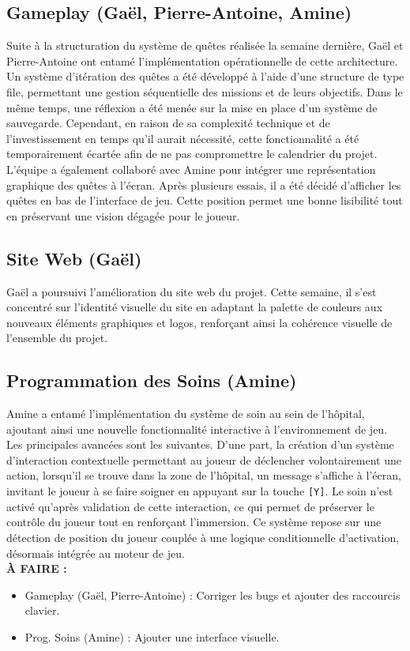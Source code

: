\documentclass{report}
\begin{document}
\subsection*{Gameplay (Gaël, Pierre-Antoine, Amine)}
Suite à la structuration du système de quêtes réalisée la semaine dernière, Gaël et Pierre-Antoine ont entamé l’implémentation opérationnelle de cette architecture. Un système d’itération des quêtes a été développé à l’aide d’une structure de type file, permettant une gestion séquentielle des missions et de leurs objectifs. Dans le même temps, une réflexion a été menée sur la mise en place d’un système de sauvegarde. Cependant, en raison de sa complexité technique et de l'investissement en temps qu’il aurait nécessité, cette fonctionnalité a été temporairement écartée afin de ne pas compromettre le calendrier du projet. L’équipe a également collaboré avec Amine pour intégrer une représentation graphique des quêtes à l’écran. Après plusieurs essais, il a été décidé d’afficher les quêtes en bas de l’interface de jeu. Cette position permet une bonne lisibilité tout en préservant une vision dégagée pour le joueur.


\subsection*{Site Web (Gaël)}
Gaël a poursuivi l’amélioration du site web du projet. Cette semaine, il s’est concentré sur l’identité visuelle du site en adaptant la palette de couleurs aux nouveaux éléments graphiques et logos, renforçant ainsi la cohérence visuelle de l’ensemble du projet.

\subsection*{Programmation des Soins (Amine)}
Amine a entamé l’implémentation du système de soin au sein de l’hôpital, ajoutant ainsi une nouvelle fonctionnalité interactive à l’environnement de jeu. Les principales avancées sont les suivantes. D’une part, la création d’un système d’interaction contextuelle permettant au joueur de déclencher volontairement une action, lorsqu’il se trouve dans la zone de l’hôpital, un message s’affiche à l’écran, invitant le joueur à se faire soigner en appuyant sur la touche \texttt{[Y]}. Le soin n’est activé qu’après validation de cette interaction, ce qui permet de préserver le contrôle du joueur tout en renforçant l’immersion. Ce système repose sur une détection de position du joueur couplée à une logique conditionnelle d’activation, désormais intégrée au moteur de jeu.
\\[1cm]
\textbf{À FAIRE :}
\begin{itemize}
    \item Gameplay (Gaël, Pierre-Antoine) : Corriger les bugs et ajouter des raccourcis clavier.
    \item Prog. Soins (Amine) : Ajouter une interface visuelle.
\end{itemize}
\end{document}
